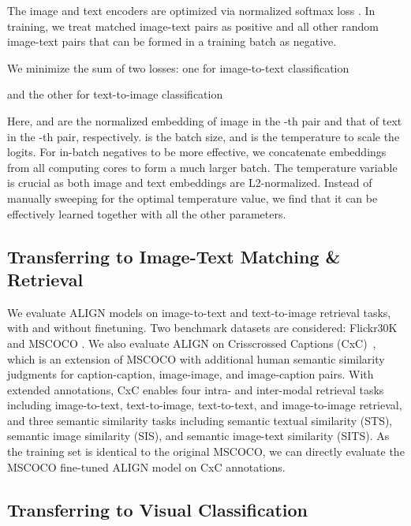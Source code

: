\documentclass{article}
\begin{document}
The image and text encoders are optimized via normalized softmax loss \cite{zhai:norm_softmax}. In training, we treat matched image-text pairs as positive and all other random image-text pairs that can be formed in a training batch as negative.

We minimize the sum of two losses: one for image-to-text classification
\vspace{-0.2cm}

\vspace{-0.2cm}
and the other for text-to-image classification

\vspace{-0.4cm}

Here,  and  are the normalized embedding of image in the -th pair and that of text in the -th pair, respectively.  is the  batch size, and  is the temperature to scale the logits. For in-batch negatives to be more effective, we concatenate embeddings from all computing cores to form a much larger batch. The temperature variable is crucial as both image and text embeddings are L2-normalized. Instead of manually sweeping for the optimal temperature value, we find that it can be effectively learned together with all the other parameters.

\vspace{-0.2cm}
\subsection{Transferring to Image-Text Matching \& Retrieval}

We evaluate ALIGN models on image-to-text and text-to-image retrieval tasks, with and without finetuning. Two benchmark datasets are considered: Flickr30K \cite{plummer:flickr30k} and MSCOCO \cite{chen:coco}. We also evaluate ALIGN on Crisscrossed Captions (CxC)~\cite{parekh:cxc}, which is an extension of MSCOCO with additional human semantic similarity judgments for caption-caption, image-image, and image-caption pairs.
With extended annotations, CxC enables four intra- and inter-modal retrieval tasks including image-to-text, text-to-image, text-to-text, and image-to-image retrieval, and three semantic similarity tasks including semantic textual similarity (STS), semantic image similarity (SIS), and semantic image-text similarity (SITS). 
As the training set is identical to the original MSCOCO, we can directly evaluate the MSCOCO fine-tuned ALIGN model on CxC annotations.
\vspace{-0.2cm}
\subsection{Transferring to Visual Classification}
\end{document}
